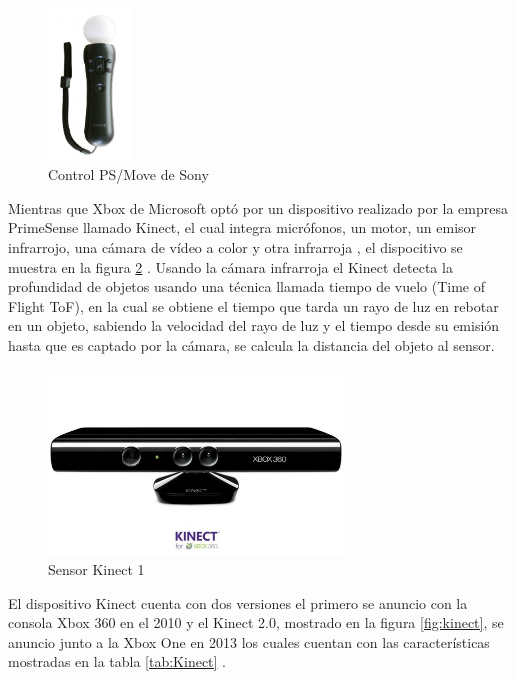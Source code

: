        \begin{figure}[!htb]
        	\centering
        	\includegraphics[width=0.2\textwidth]{01Introduccion/imagenes/PsMOve.JPG}
        	\caption{Control PS/Move de Sony} 
        	\label{fig:psMove}
        \end{figure}
        
        Mientras que Xbox de Microsoft optó por un dispositivo realizado por la empresa PrimeSense llamado Kinect, el cual integra micrófonos, un motor, un emisor infrarrojo, una cámara de vídeo a color y otra infrarroja \cite{UsodelKi56:online}, el dispocitivo se muestra en la figura \ref{fig:kinect1} \cite{Microsof29:online}. Usando la cámara infrarroja el Kinect detecta la profundidad de objetos usando una técnica llamada tiempo de vuelo (Time of Flight ToF), en la cual se obtiene el tiempo que tarda un rayo de luz en rebotar en un objeto, sabiendo la velocidad del rayo de luz y el tiempo desde su emisión hasta que es captado por la cámara, se calcula la distancia del objeto al sensor\cite{Lachat2015}.\\
        
        \begin{figure}[!htb]
        	\centering
        	\includegraphics[width=0.7\textwidth]{01Introduccion/imagenes/xbox360kinect.JPG}
        	\caption{Sensor Kinect 1} 
        	\label{fig:kinect1}
        \end{figure}
        
        El dispositivo Kinect cuenta con dos versiones el primero se anuncio con la consola Xbox 360 en el 2010 y el Kinect 2.0, mostrado en la figura \ref{fig:kinect}, se anuncio junto a la Xbox One en 2013 los cuales cuentan con las características mostradas en la tabla \ref{tab:Kinect} \cite{UsodelKi56:online}.\\
        
